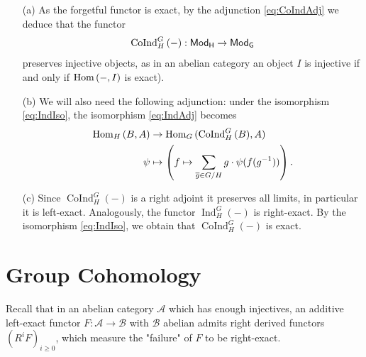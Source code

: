 \documentclass[a4paper, oneside]{memoir}
\begin{document}
\begin{remark}\label{rm:Adj}
    \begin{itemize}
        \item[(a)] As the forgetful functor is exact, by the adjunction \eqref{eq:CoIndAdj} we deduce that the functor
              \[
                  \operatorname{CoInd}^G_H{(-)}:\mathsf{Mod}_\mathsf{H}\to\mathsf{Mod}_\mathsf{G}
              \]
              preserves injective objects, as in an abelian category an object $I$ is injective if and only if $\operatorname{Hom}{(-,I)}$ is exact).
        \item[(b)] We will also need the following adjunction: under the isomorphism \eqref{eq:IndIso}, the isomorphism \eqref{eq:IndAdj} becomes
              \begin{align*}
                  \operatorname{Hom}_H{(B,A)} & \to \operatorname{Hom}_G{(\operatorname{CoInd}^G_H{(B)},A)}                                        \\
                  \psi          & \mapsto \left(f\mapsto \sum_{\overline{g} \in G / H}{g\cdot \psi(f(g^{-1}))}\right).
              \end{align*}
        \item[(c)] Since $\operatorname{CoInd}^G_H{(-)}$ is a right adjoint it preserves all limits, in particular it is left-exact. Analogously, the functor $\operatorname{Ind}^G_H{(-)}$ is right-exact. By the isomorphism \eqref{eq:IndIso}, we obtain that $\operatorname{CoInd}^G_H{(-)}$ is exact.
    \end{itemize}
\end{remark}

\section{Group Cohomology}

Recall that in an abelian category $\mathcal{A}$ which has enough injectives, an additive left-exact functor $F:\mathcal{A}\to\mathcal{B}$ with $\mathcal{B}$ abelian admits right derived functors $(R^iF)_{i\geq 0}$, which measure the "failure" of $F$ to be right-exact.
\end{document}
